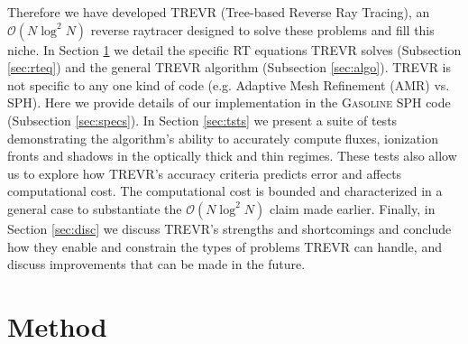 \documentclass[fleq,usenatbib]{mnras}
\newcommand{\acro}{TREVR}
\newcommand{\bigO}[1]{\mathcal{O}\left(#1\right)}
\begin{document}
{Therefore we 
have developed \acro{} (Tree-based Reverse Ray Tracing),
an $\bigO{N \log^2 N}$ reverse raytracer designed to 
solve these problems and fill this niche. In Section \ref{sec:mthd} we detail 
the specific RT equations \acro{} solves (Subsection \ref{sec:rteq}) and the 
general \acro{} algorithm (Subsection \ref{sec:algo}).  \acro{} is not specific
to any one kind of code (e.g. Adaptive Mesh Refinement (AMR) vs. SPH).
Here we provide details of 
our implementation in the \textsc{Gasoline} SPH code (Subsection \ref{sec:specs}). In 
Section \ref{sec:tsts} we present a suite of tests demonstrating the 
algorithm's ability to accurately compute fluxes, ionization fronts and 
shadows in the optically thick and thin regimes. These tests also allow us to 
explore how \acro{}'s accuracy criteria predicts error and affects 
computational cost. The computational cost is bounded and characterized in a 
general case to substantiate the $\bigO{N \log^2 N}$ claim made earlier. 
Finally, in Section \ref{sec:disc} we discuss \acro{}'s strengths and 
shortcomings and conclude how they enable and constrain the types of problems 
\acro{} can handle, and discuss improvements that can be made in the future.

\section{Method}\label{sec:mthd}
}
\end{document}
